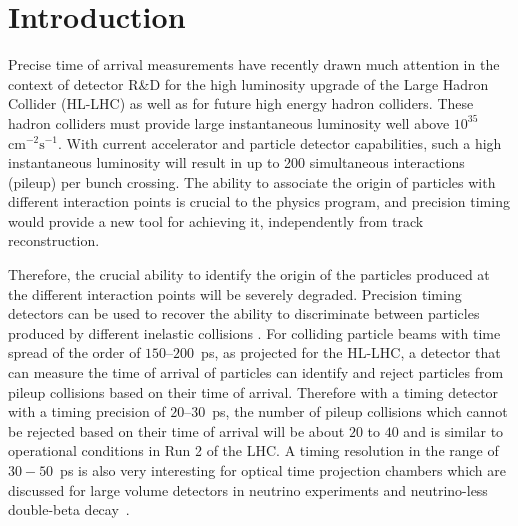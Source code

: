 \section{Introduction}
\label{sec:introduction}


Precise time of arrival measurements have recently drawn much attention in the
context of detector R\&D for the high luminosity upgrade of the Large Hadron
Collider (HL-LHC) as well as for future high energy hadron colliders. These
hadron colliders must provide large instantaneous luminosity well above
$10^{35}$~$\mathrm{cm}^{-2}\mathrm{s}^{-1}$. With current accelerator and
particle detector capabilities, such a high instantaneous luminosity will result
in up to 200 simultaneous interactions (pileup) per bunch crossing. 
The ability to associate the origin of particles with different interaction points 
is crucial to the physics program, and precision timing would provide a new tool 
for achieving it, independently from track reconstruction.


Therefore,
the crucial ability to identify the origin of the particles produced at the
different interaction points will be severely degraded. Precision timing
detectors can be used to recover the ability to discriminate between particles
produced by different inelastic collisions \cite{adielba}. For colliding
particle beams with time spread of the order of $150$--$200$~ps, as projected for
the HL-LHC, a detector that can measure the time of arrival of particles can
identify and reject particles from pileup collisions based on their time of
arrival. Therefore with a timing detector with a timing precision of
$20$--$30$~ps, the number of pileup collisions which cannot be rejected based on
their time of arrival will be about $20$ to $40$ and is similar to operational
conditions in Run 2 of the LHC. A timing resolution in the range of $30-50$~ps
is also very interesting for optical time projection chambers which are
discussed for large volume detectors in neutrino experiments and neutrino-less
double-beta decay~\cite{Aberle:2013jba, otpc}. 

